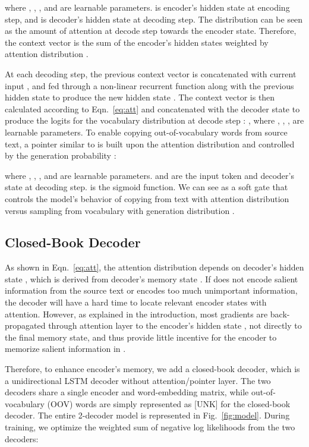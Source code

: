 \documentclass[11pt,a4paper]{article}
\def\figref#1{Fig.~\ref{#1}}
\def\eqnref#1{Eqn.~\ref{#1}}
\begin{document}
where , , , and  are learnable parameters.  is encoder's hidden state at  encoding step, and  is decoder's hidden state at  decoding step. 
The distribution  can be seen as the amount of attention at decode step  towards the  encoder state. Therefore, the context vector  is the sum of the encoder's hidden states weighted by attention distribution . 

At each decoding step, the previous context vector  is concatenated with current input , and fed through a non-linear recurrent function along with the previous hidden state  to produce the new hidden state .
The context vector  is then calculated according to \eqnref{eq:att} and concatenated with the decoder state  to produce the logits for the vocabulary distribution  at decode step :
 , where , , ,  are learnable parameters. 
To enable copying out-of-vocabulary words from source text, a pointer similar to  is built upon the attention distribution and controlled by the generation probability :

where , , , and  are learnable parameters.  and  are the input token and decoder's state at  decoding step.  is the sigmoid function. We can see  as a soft gate that controls the model's behavior of copying from text with attention distribution  versus sampling from vocabulary with generation distribution .



\subsection{Closed-Book Decoder}
As shown in \eqnref{eq:att}, the attention distribution  depends on decoder's hidden state , which is derived from decoder's memory state . If  does not encode salient information from the source text or encodes too much unimportant information, the decoder will have a hard time to locate relevant encoder states with attention.
However, as explained in the introduction, most gradients are back-propagated through attention layer to the encoder's hidden state , not directly to the final memory state, and thus provide little incentive for the encoder to memorize salient information in . 

Therefore, to enhance encoder's memory, we add a closed-book decoder, which is a unidirectional LSTM decoder 
without attention/pointer layer. The two decoders share a single encoder and word-embedding matrix, while out-of-vocabulary (OOV) words are simply represented as [UNK] for the closed-book decoder. The entire 2-decoder model is represented in \figref{fig:model}.
During training, we optimize the weighted sum of negative log likelihoods from the two decoders:
\vspace{-5pt}
\end{document}
